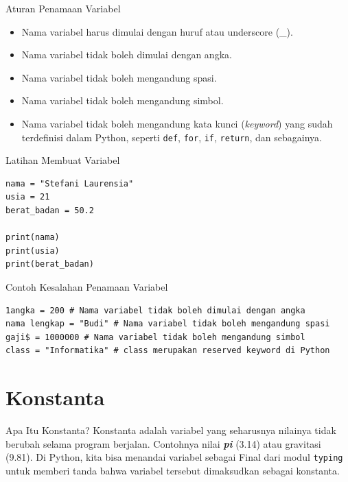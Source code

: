 \documentclass[aspectratio=169, table]{beamer}
\begin{document}
\begin{frame}{Aturan Penamaan Variabel}
\begin{itemize}
\item Nama variabel harus dimulai dengan huruf atau underscore (\_).
\item Nama variabel tidak boleh dimulai dengan angka.
\item Nama variabel tidak boleh mengandung spasi.
\item Nama variabel tidak boleh mengandung simbol.
\item Nama variabel tidak boleh mengandung kata kunci (\textit{keyword}) yang sudah terdefinisi dalam Python, seperti \texttt{def}, \texttt{for}, \texttt{if}, \texttt{return}, dan sebagainya.
\end{itemize}
\end{frame}

\begin{frame}[fragile]{Latihan Membuat Variabel}
\begin{lstlisting}[style=PythonStyle, caption={Kode Python: variable.py}]
nama = "Stefani Laurensia"
usia = 21
berat_badan = 50.2

print(nama)
print(usia)
print(berat_badan)
\end{lstlisting}
\end{frame}

\begin{frame}[fragile]{Contoh Kesalahan Penamaan Variabel}
\begin{lstlisting}[style=PythonStyle, caption={Kode Python: variable.py}]
1angka = 200 # Nama variabel tidak boleh dimulai dengan angka
nama lengkap = "Budi" # Nama variabel tidak boleh mengandung spasi
gaji$ = 1000000 # Nama variabel tidak boleh mengandung simbol
class = "Informatika" # class merupakan reserved keyword di Python
\end{lstlisting}
\end{frame}

\section{Konstanta}
\begin{frame}{Apa Itu Konstanta?}
Konstanta adalah variabel yang seharusnya nilainya tidak berubah selama program berjalan. Contohnya nilai \textbf{\textit{pi}} (3.14) atau gravitasi (9.81). Di Python, kita bisa menandai variabel sebagai Final dari modul \texttt{typing} untuk memberi tanda bahwa variabel tersebut dimaksudkan sebagai konstanta.
\end{frame}
\end{document}
